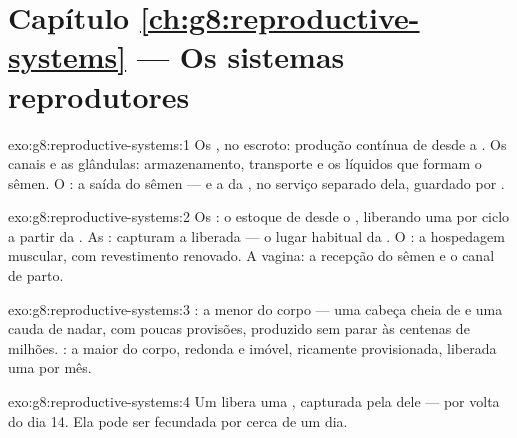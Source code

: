 \section*{Capítulo \ref{ch:g8:reproductive-systems} --- Os sistemas reprodutores}

\begin{solution}{exo:g8:reproductive-systems:1}
Os , no escroto: produção contínua de  desde
a . Os canais e as glândulas: armazenamento, transporte e os
líquidos que formam o sêmen. O : a saída do sêmen --- e a da
, no serviço separado dela, guardado por .
\end{solution}

\begin{solution}{exo:g8:reproductive-systems:2}
Os : o estoque de  desde o
, liberando uma por ciclo a partir da . As : capturam a  liberada --- o lugar habitual da
. O : a hospedagem muscular, com revestimento renovado.
A vagina: a recepção do sêmen e o canal de parto.
\end{solution}

\begin{solution}{exo:g8:reproductive-systems:3}
: a menor  do corpo --- uma cabeça cheia de 
e uma cauda de nadar, com poucas provisões, produzido sem parar às
centenas de milhões. : a maior  do
corpo, redonda e imóvel, ricamente provisionada, liberada uma por mês.
\end{solution}

\begin{solution}{exo:g8:reproductive-systems:4}
Um  libera uma , capturada pela  dele --- por volta do dia 14. Ela pode ser fecundada por cerca
de um dia.
\end{solution}

